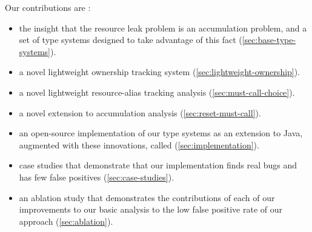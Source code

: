 Our contributions are :
\begin{itemize}
\item the insight that the resource leak problem is an accumulation problem,
  and a set of type systems designed to take advantage of this fact (\cref{sec:base-type-systems}).
\item a novel lightweight ownership tracking system (\cref{sec:lightweight-ownership}).
\item a novel lightweight resource-alias tracking analysis (\cref{sec:must-call-choice}).
\item a novel extension to accumulation analysis (\cref{sec:reset-must-call}).
\item an open-source implementation of our type systems as an extension to Java,
  augmented with these innovations, called \tool (\cref{sec:implementation}).
\item case studies that demonstrate that our implementation finds real
  bugs and has few false positives (\cref{sec:case-studies}).
\item an ablation study that demonstrates the contributions of
  each of our improvements to our basic analysis to the low false
  positive rate of our approach (\cref{sec:ablation}).
\end{itemize}
  
